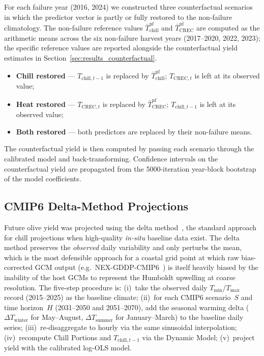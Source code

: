\documentclass[agronomy,article,submit,pdftex,moreauthors]{Definitions/mdpi}
\begin{document}
For each failure year (2016, 2024) we constructed three counterfactual scenarios in which the predictor vector is partly or fully restored to the non-failure climatology. The non-failure reference values $\bar{T}_{\text{chill}}^{\text{nf}}$ and $\bar{T}_{\text{CREC}}^{\text{nf}}$ are computed as the arithmetic means across the six non-failure harvest years (2017--2020, 2022, 2023); the specific reference values are reported alongside the counterfactual yield estimates in Section~\ref{sec:results_counterfactual}.
\begin{itemize}
  \item \textbf{Chill restored} --- $T_{\text{chill},t-1}$ is replaced by $\bar{T}_{\text{chill}}^{\text{nf}}$; $T_{\text{CREC},t}$ is left at its observed value;
  \item \textbf{Heat restored}  --- $T_{\text{CREC},t}$ is replaced by $\bar{T}_{\text{CREC}}^{\text{nf}}$; $T_{\text{chill},t-1}$ is left at its observed value;
  \item \textbf{Both restored}  --- both predictors are replaced by their non-failure means.
\end{itemize}
The counterfactual yield is then computed by passing each scenario through the calibrated model and back-transforming. Confidence intervals on the counterfactual yield are propagated from the 5000-iteration year-block bootstrap of the model coefficients.

\subsection{CMIP6 Delta-Method Projections}
\label{sec:cmip6_method}

Future olive yield was projected using the delta method~\cite{luedeling2012,hannah2013}, the standard approach for chill projections when high-quality \emph{in-situ} baseline data exist. The delta method preserves the \emph{observed} daily variability and only perturbs the mean, which is the most defensible approach for a coastal grid point at which raw bias-corrected GCM output (e.g.\ NEX-GDDP-CMIP6~\cite{thrasher2022}) is itself heavily biased by the inability of the host GCMs to represent the Humboldt upwelling at coarse resolution. The five-step procedure is: (i)~take the observed daily $T_{\min}$/$T_{\max}$ record (2015--2025) as the baseline climate; (ii)~for each CMIP6 scenario~$S$ and time horizon~$H$ (2031--2050 and 2051--2070), add the seasonal warming delta ($\Delta T_{\text{winter}}$ for May--August, $\Delta T_{\text{summer}}$ for January--March) to the baseline daily series; (iii)~re-disaggregate to hourly via the same sinusoidal interpolation; (iv)~recompute Chill Portions and $T_{\text{chill},t-1}$ via the Dynamic Model; (v)~project yield with the calibrated log-OLS model.
\end{document}
